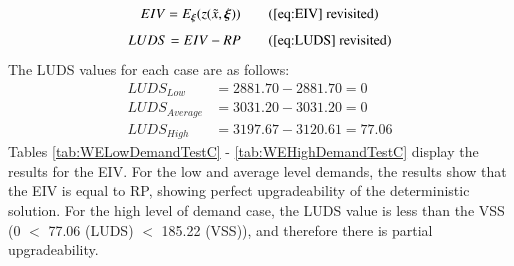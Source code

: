 \documentclass[../thesis.tex]{subfiles}
\begin{document}
{\begin{equation}
    EIV = E_{\boldsymbol{\xi}}(z(\Tilde{x},\boldsymbol{\xi})) \tag{\ref{eq:EIV} revisited}
\end{equation}
\begin{equation}
    LUDS = EIV - RP \tag{\ref{eq:LUDS} revisited}
\end{equation}
The LUDS values for each case are as follows:
\begin{align}
    LUDS_{Low} &= 2881.70 - 2881.70 = 0 \\
    LUDS_{Average} &= 3031.20 - 3031.20 = 0 \\
    LUDS_{High} &= 3197.67 - 3120.61 = 77.06
\end{align}
Tables \ref{tab:WELowDemandTestC} - \ref{tab:WEHighDemandTestC} display the results for the EIV. For the low and average level demands, the results show that the EIV is equal to RP, showing perfect upgradeability of the deterministic solution. For the high level of demand case, the LUDS value is less than the VSS (0 $<$ 77.06 (LUDS) $<$ 185.22 (VSS)), and therefore there is partial upgradeability.




\begin{table}[h!]
    \centering{}
    \caption{Low Demand Worked Example where results are recorded [(beds), (staff)] - Test C Results}
    \label{tab:WELowDemandTestC}
\end{table}

}
\end{document}
